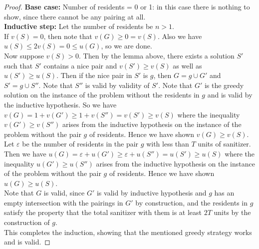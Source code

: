 \documentclass[answers]{exam}
\newcommand{\nl}{\vspace{0.2cm}\\}
\begin{document}
\begin{questions}
\begin{solution}
\begin{proof}
\textbf{Base case:} Number of residents = 0 or 1: in this case there is nothing to show, since there cannot be any pairing at all.\nl
\textbf{Inductive step:} Let the number of residents be $n > 1$. \nl
If $v(S) = 0$, then note that $v(G) \ge 0 = v(S)$. Also we have $u(S) \le 2v(S) = 0 \le u(G)$, so we are done. \nl
Now suppose $v(S) > 0$. Then by the lemma above, there exists a solution $S'$ such that $S'$ contains a nice pair and $v(S') \ge v(S)$ as well as $u(S') \ge u(S)$. Then if the nice pair in $S'$ is $g$, then $G = g \cup G'$ and $S' = g \cup S''$. Note that $S''$ is valid by validity of $S'$. Note that $G'$ is the greedy solution on the instance of the problem without the residents in $g$ and is valid by the inductive hypothesis. So we have $v(G) = 1 + v(G') \ge 1 + v(S'') = v(S') \ge v(S)$ where the inequality $v(G') \ge v(S'')$ arises from the inductive hypothesis on the instance of the problem without the pair $g$ of residents. Hence we have shown $v(G) \ge v(S)$.\nl
Let $\varepsilon$ be the number of residents in the pair $g$ with less than $T$ units of sanitizer. Then we have $u(G) = \varepsilon + u(G') \ge \varepsilon + u(S'') = u(S') \ge u(S)$ where the inequality $u(G') \ge u(S'')$ arises from the inductive hypothesis on the instance of the problem without the pair $g$ of residents. Hence we have shown $u(G) \ge u(S)$.\nl
Note that $G$ is valid, since $G'$ is valid by inductive hypothesis and $g$ has an empty intersection with the pairings in $G'$ by construction, and the residents in $g$ satisfy the property that the total sanitizer with them is at least $2T$ units by the construction of $g$.\nl
This completes the induction, showing that the mentioned greedy strategy works and is valid.
\end{proof}


\end{solution}
\end{questions}
\end{document}
